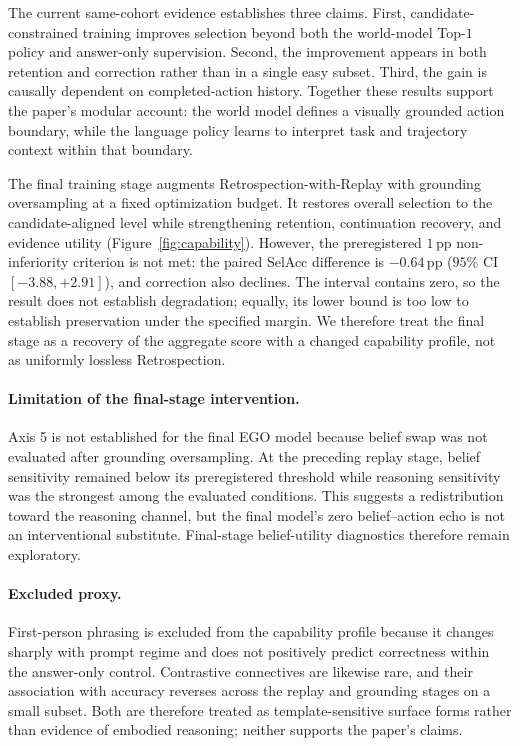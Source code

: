 \documentclass[letterpaper]{article}
\newcommand{\obs}[1]{\textcolor{measuredblue}{#1}}
\newcommand{\pp}{\,\mathrm{pp}}
\newcommand{\method}{\textsc{EGO}}
\begin{document}
The current same-cohort evidence establishes three claims.  First,
candidate-constrained training improves selection beyond both the
world-model Top-\obs{$1$} policy and answer-only supervision.  Second, the
improvement appears in both retention and correction rather than in a single
easy subset.  Third, the gain is causally dependent on completed-action
history.  Together these results support the paper's modular account:
the world model defines a visually grounded action boundary, while the
language policy learns to interpret task and trajectory context within that
boundary.

The final training stage augments Retrospection-with-Replay with grounding
oversampling at a fixed optimization budget.  It restores overall selection
to the candidate-aligned level while strengthening retention, continuation
recovery, and evidence utility (Figure~\ref{fig:capability}).  However, the
preregistered \obs{$1\pp$} non-inferiority criterion is not met: the paired
SelAcc difference is \obs{$-0.64\pp$}
(\obs{$95\%$ CI $[-3.88,+2.91]$}), and correction also declines.  The interval
contains zero, so the result does not establish degradation; equally, its
lower bound is too low to establish preservation under the specified margin.
We therefore treat the final stage as a recovery of the aggregate score with
a changed capability profile, not as uniformly lossless Retrospection.

{\color{pendingred}
\paragraph{Limitation of the final-stage intervention.}
Axis 5 is not established for the final \method{} model because belief swap
was not evaluated after grounding oversampling.  At the preceding replay
stage, belief sensitivity remained below its preregistered threshold while
reasoning sensitivity was the strongest among the evaluated conditions.  This
suggests a redistribution toward the reasoning channel, but the final model's
zero belief--action echo is not an interventional substitute.  Final-stage
belief-utility diagnostics therefore remain exploratory.
\par}

{\color{pendingred}
\paragraph{Excluded proxy.}
First-person phrasing is excluded from the capability profile because it
changes sharply with prompt regime and does not positively predict correctness
within the answer-only control.  Contrastive connectives are likewise rare,
and their association with accuracy reverses across the replay and grounding
stages on a small subset.  Both are therefore treated as template-sensitive
surface forms rather than evidence of embodied reasoning; neither supports
the paper's claims.
\par}
\end{document}
